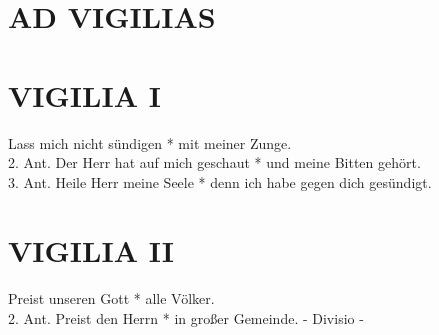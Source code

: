 \thispagestyle{plain}



\section[VIGILIAE]{AD VIGILIAS}

\begin{sloppypar}
{}
\end{sloppypar}

\bigskip



\section{VIGILIA I}

\begin{sloppypar}
{  Lass mich nicht sündigen * mit meiner Zunge. \\
2. Ant. Der Herr hat auf mich geschaut * und meine Bitten gehört. \\
3. Ant. Heile Herr meine Seele * denn ich habe gegen dich gesündigt.  \\}
\end{sloppypar}

\begin{flushleft}


\end{flushleft}

\section{VIGILIA II}

\begin{sloppypar}
{ Preist unseren Gott * alle Völker. \\
2. Ant. Preist den Herrn * in großer Gemeinde.  - Divisio -  }\\ 

\end{sloppypar}

\begin{flushleft}


\end{flushleft}



